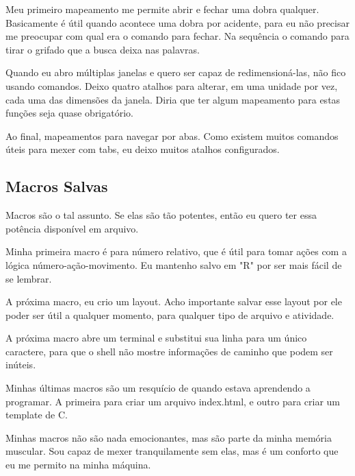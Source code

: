 Meu primeiro mapeamento  me permite
abrir e fechar uma dobra qualquer.
Basicamente é útil quando acontece uma dobra por acidente, para eu não precisar me preocupar com
qual era o comando para fechar.
Na sequência o comando para tirar o grifado que a busca deixa nas palavras.

Quando eu abro múltiplas janelas e quero ser capaz de redimensioná-las, não fico usando comandos.
Deixo quatro atalhos para alterar, em uma unidade por vez, cada uma das dimensões da janela.
Diria que ter algum mapeamento para estas funções seja quase obrigatório.

Ao final, mapeamentos para navegar por abas.
Como existem muitos comandos úteis para mexer com tabs, eu deixo muitos
atalhos configurados.

\subsection{Macros Salvas}
Macros são o tal assunto.
Se elas são tão potentes, então eu quero ter essa potência disponível em arquivo.

Minha primeira macro é para número relativo, que é útil para tomar ações com a lógica número-ação-movimento.
Eu mantenho salvo em "R" por ser mais fácil de se lembrar.

A próxima macro, eu crio um layout.
Acho importante salvar esse layout por ele poder ser útil a qualquer momento, para qualquer tipo de arquivo e atividade.

A próxima macro abre um terminal e substitui sua linha para um único caractere, para que o shell
não mostre informações de caminho que podem ser inúteis.

Minhas últimas macros são um resquício de quando estava aprendendo a programar.
A primeira para criar um arquivo index.html, e outro para criar um template de C.

Minhas macros não são nada emocionantes, mas são parte da minha memória muscular.
Sou capaz de mexer tranquilamente sem elas, mas é um conforto que eu me permito na minha máquina.

\newpage
